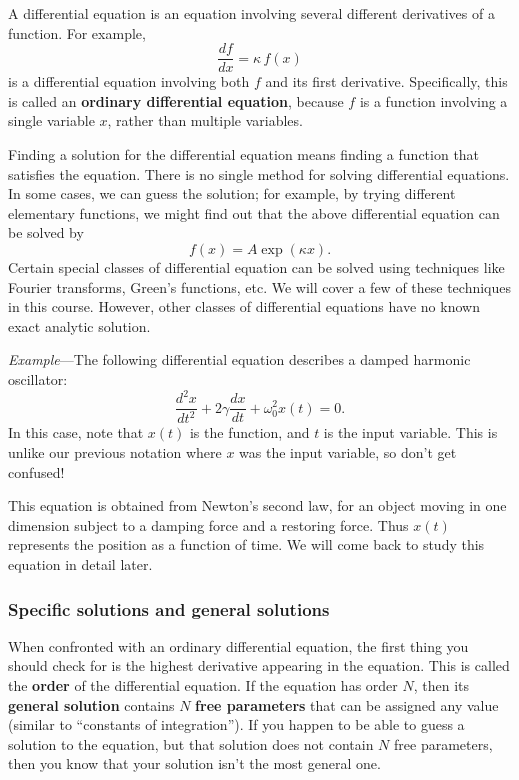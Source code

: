\documentclass[10pt,a4paper]{article}
\begin{document}
A differential equation is an equation involving several different
derivatives of a function. For example,
\begin{equation}
\frac{df}{dx} = \kappa\, f(x)
\end{equation}
is a differential equation involving both $f$ and its first
derivative. Specifically, this is called an \textbf{ordinary
  differential equation}, because $f$ is a function involving a single
variable $x$, rather than multiple variables.

Finding a solution for the differential equation means finding a
function that satisfies the equation. There is no single method for
solving differential equations. In some cases, we can guess the
solution; for example, by trying different elementary functions, we
might find out that the above differential equation can be solved by
\begin{equation}
f(x) = A \exp(\kappa x).
\end{equation}
Certain special classes of differential equation can be solved using
techniques like Fourier transforms, Green's functions, etc. We will
cover a few of these techniques in this course. However, other classes
of differential equations have no known exact analytic solution.

\begin{framed}
  \noindent
\textit{Example}---The following differential equation describes a
damped harmonic oscillator:
\begin{equation*}
  \frac{d^2 x}{dt^2} + 2\gamma\frac{dx}{dt} + \omega_0^2 x(t) = 0.
\end{equation*}
In this case, note that $x(t)$ is the function, and $t$ is the input
variable. This is unlike our previous notation where $x$ was the input
variable, so don't get confused!

This equation is obtained from Newton's second law, for an object moving
in one dimension subject to a damping force and a restoring force. Thus
$x(t)$ represents the position as a function of time. We will come
back to study this equation in detail later.
\end{framed}

    \hypertarget{specific-solutions-and-general-solutions}{%
\subsubsection{Specific solutions and general
solutions}\label{specific-solutions-and-general-solutions}}

When confronted with an ordinary differential equation, the first thing
you should check for is the highest derivative appearing in the
equation. This is called the \textbf{order} of the differential
equation. If the equation has order $N$, then its \textbf{general
solution} contains $N$ \textbf{free parameters} that can be assigned
any value (similar to ``constants of integration''). If you happen to be
able to guess a solution to the equation, but that solution does not
contain $N$ free parameters, then you know that your solution isn't
the most general one.
\end{document}
